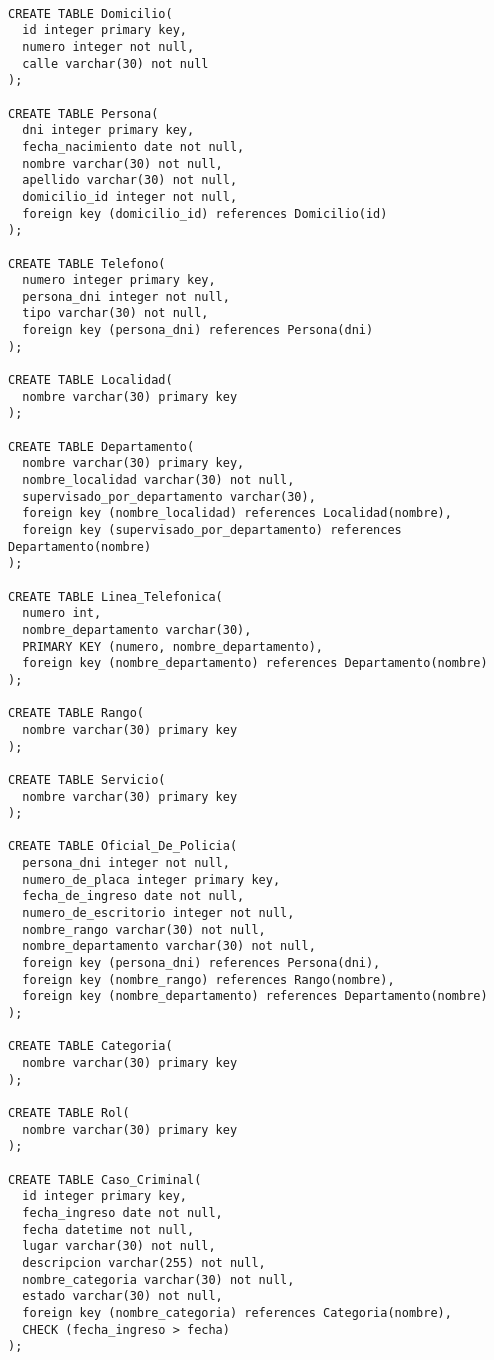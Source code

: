 \documentclass[10pt,a4paper]{article}
\begin{document}
\begin{verbatim}

CREATE TABLE Domicilio(
  id integer primary key,
  numero integer not null,
  calle varchar(30) not null
);

CREATE TABLE Persona(
  dni integer primary key,
  fecha_nacimiento date not null,
  nombre varchar(30) not null,
  apellido varchar(30) not null,
  domicilio_id integer not null,
  foreign key (domicilio_id) references Domicilio(id)
);

CREATE TABLE Telefono(
  numero integer primary key,
  persona_dni integer not null,
  tipo varchar(30) not null,
  foreign key (persona_dni) references Persona(dni)
);

CREATE TABLE Localidad(
  nombre varchar(30) primary key
);

CREATE TABLE Departamento(
  nombre varchar(30) primary key,
  nombre_localidad varchar(30) not null,
  supervisado_por_departamento varchar(30),
  foreign key (nombre_localidad) references Localidad(nombre),
  foreign key (supervisado_por_departamento) references Departamento(nombre)
);

CREATE TABLE Linea_Telefonica(
  numero int,
  nombre_departamento varchar(30),
  PRIMARY KEY (numero, nombre_departamento),
  foreign key (nombre_departamento) references Departamento(nombre)
);

CREATE TABLE Rango(
  nombre varchar(30) primary key
);

CREATE TABLE Servicio(
  nombre varchar(30) primary key
);

CREATE TABLE Oficial_De_Policia(
  persona_dni integer not null,
  numero_de_placa integer primary key,
  fecha_de_ingreso date not null,
  numero_de_escritorio integer not null,
  nombre_rango varchar(30) not null,
  nombre_departamento varchar(30) not null,
  foreign key (persona_dni) references Persona(dni),
  foreign key (nombre_rango) references Rango(nombre),
  foreign key (nombre_departamento) references Departamento(nombre)
);

CREATE TABLE Categoria(
  nombre varchar(30) primary key
);

CREATE TABLE Rol(
  nombre varchar(30) primary key
);

CREATE TABLE Caso_Criminal(
  id integer primary key,
  fecha_ingreso date not null,
  fecha datetime not null,
  lugar varchar(30) not null,
  descripcion varchar(255) not null,
  nombre_categoria varchar(30) not null,
  estado varchar(30) not null,
  foreign key (nombre_categoria) references Categoria(nombre),
  CHECK (fecha_ingreso > fecha)
);


\end{verbatim}
\end{document}
